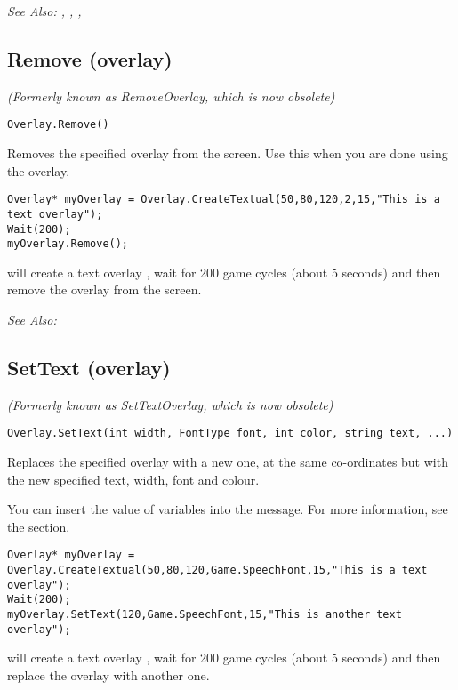 \it{See Also:} , ,
, 


\subsection{Remove (overlay)}\label{Overlay.Remove}%

\it{(Formerly known as RemoveOverlay, which is now obsolete)}

\begin{verbatim}
Overlay.Remove()
\end{verbatim}
Removes the specified overlay from the screen. Use this when you are
done using the overlay.

\begin{verbatim}
Overlay* myOverlay = Overlay.CreateTextual(50,80,120,2,15,"This is a text overlay");
Wait(200);
myOverlay.Remove();
\end{verbatim}
will create a text overlay , wait for 200 game cycles (about 5 seconds) and then
remove the overlay from the screen.

\it{See Also:} 


\subsection{SetText (overlay)}\label{Overlay.SetText}%

\it{(Formerly known as SetTextOverlay, which is now obsolete)}

\begin{verbatim}
Overlay.SetText(int width, FontType font, int color, string text, ...)
\end{verbatim}
Replaces the specified overlay with a new one, at the same co-ordinates but with
the new specified text, width, font and colour.

You can insert the value of variables into the message. For more information,
see the  section.

\begin{verbatim}
Overlay* myOverlay = Overlay.CreateTextual(50,80,120,Game.SpeechFont,15,"This is a text overlay");
Wait(200);
myOverlay.SetText(120,Game.SpeechFont,15,"This is another text overlay");
\end{verbatim}
will create a text overlay , wait for 200 game cycles (about 5 seconds) and then
replace the overlay with another one.

